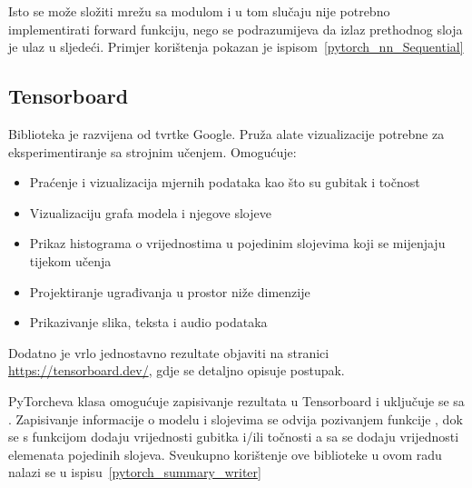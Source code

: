 Isto se može složiti mrežu sa  modulom i u tom slučaju nije potrebno implementirati forward funkciju, nego se podrazumijeva da izlaz prethodnog sloja je ulaz u sljedeći. Primjer korištenja  pokazan je ispisom~\ref{pytorch_nn_Sequential}


\subsection{Tensorboard}
Biblioteka je razvijena od tvrtke Google. Pruža alate vizualizacije potrebne za eksperimentiranje sa strojnim učenjem. 
Omogućuje:
\begin{itemize}
	\item Praćenje i vizualizacija mjernih podataka kao što su gubitak i točnost
	\item Vizualizaciju grafa modela i njegove slojeve
	\item Prikaz histograma o vrijednostima u pojedinim slojevima koji se mijenjaju tijekom učenja
	\item Projektiranje ugrađivanja u prostor niže dimenzije
	\item Prikazivanje slika, teksta i audio podataka
\end{itemize}
Dodatno je vrlo jednostavno rezultate objaviti na stranici \url{https://tensorboard.dev/}, gdje se detaljno opisuje postupak.

PyTorcheva klasa  omogućuje zapisivanje rezultata u Tensorboard i uključuje se sa . Zapisivanje informacije o modelu i slojevima se odvija pozivanjem funkcije , dok se s funkcijom  dodaju vrijednosti gubitka i/ili točnosti a sa  se dodaju vrijednosti elemenata pojedinih slojeva. Sveukupno korištenje ove biblioteke u ovom radu nalazi se u ispisu~\ref{pytorch_summary_writer}
{}

